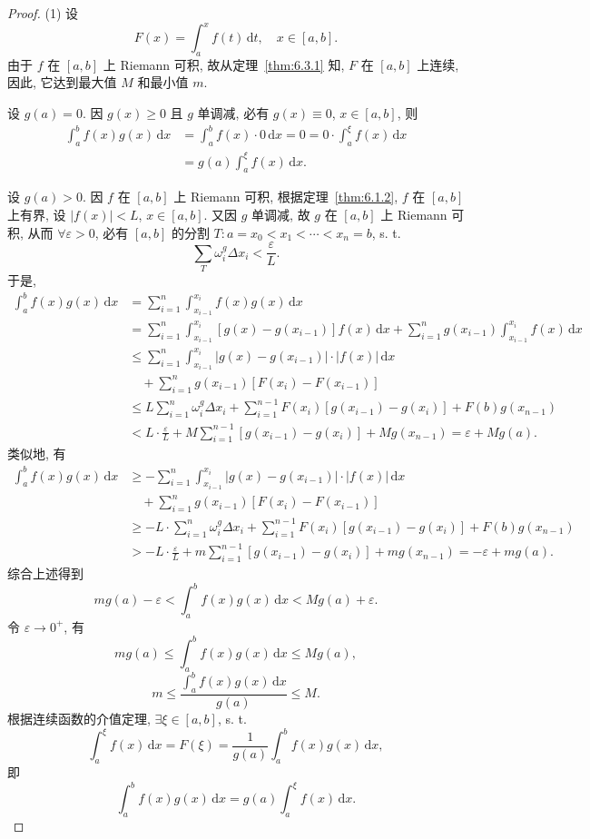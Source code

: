\begin{proof}
(1) 设
\[
F(x)=\int_{a}^{x}f(t)\,\mathrm{d}t,\quad x\in[a,b].
\]
由于 $f$ 在 $[a,b]$ 上 Riemann 可积, 故从定理~\ref{thm:6.3.1} 知, $F$ 在 $[a,b]$ 上连续, 因此, 它达到最大值 $M$ 和最小值 $m$.

设 $g(a)=0$. 因 $g(x)\geqslant 0$ 且 $g$ 单调减, 必有 $g(x)\equiv 0$, $x\in[a,b]$, 则
\begin{align*}
\int_{a}^{b}f(x)g(x)\,\mathrm{d}x&=\int_{a}^{b}f(x)\cdot 0\,\mathrm{d}x=0=0\cdot\int_{a}^{\xi}f(x)\,\mathrm{d}x\\
&=g(a)\int_{a}^{\xi}f(x)\,\mathrm{d}x.
\end{align*}

设 $g(a)>0$. 因 $f$ 在 $[a,b]$ 上 Riemann 可积, 根据定理~\ref{thm:6.1.2}, $f$ 在 $[a,b]$ 上有界, 设 $|f(x)|<L$, $x\in[a,b]$. 又因 $g$ 单调减, 故 $g$ 在 $[a,b]$ 上 Riemann 可积, 从而 $\forall\varepsilon>0$, 必有 $[a,b]$ 的分割 $T:a=x_{0}<x_{1}<\cdots<x_{n}=b$, s. t.
\[
\sum_{T}\omega_{i}^{g}\Delta x_{i}<\frac{\varepsilon}{L}.
\]
于是,
\begin{align*}
\int_{a}^{b}f(x)g(x)\,\mathrm{d}x&=\sum_{i=1}^{n}\int_{x_{i-1}}^{x_{i}}f(x)g(x)\,\mathrm{d}x\\
&=\sum_{i=1}^{n}\int_{x_{i-1}}^{x_{i}}[g(x)-g(x_{i-1})]f(x)\,\mathrm{d}x+\sum_{i=1}^{n}g(x_{i-1})\int_{x_{i-1}}^{x_{i}}f(x)\,\mathrm{d}x\\
&\leqslant\sum_{i=1}^{n}\int_{x_{i-1}}^{x_{i}}|g(x)-g(x_{i-1})|\cdot|f(x)|\,\mathrm{d}x\\
&\quad+\sum_{i=1}^{n}g(x_{i-1})[F(x_{i})-F(x_{i-1})]\\
&\leqslant L\sum_{i=1}^{n}\omega_{i}^{g}\Delta x_{i}+\sum_{i=1}^{n-1}F(x_{i})[g(x_{i-1})-g(x_{i})]+F(b)g(x_{n-1})\\
&<L\cdot\frac{\varepsilon}{L}+M\sum_{i=1}^{n-1}[g(x_{i-1})-g(x_{i})]+Mg(x_{n-1})=\varepsilon+Mg(a).
\end{align*}
类似地, 有
\begin{align*}
\int_{a}^{b}f(x)g(x)\,\mathrm{d}x&\geqslant-\sum_{i=1}^{n}\int_{x_{i-1}}^{x_{i}}|g(x)-g(x_{i-1})|\cdot|f(x)|\,\mathrm{d}x\\
&\quad+\sum_{i=1}^{n}g(x_{i-1})[F(x_{i})-F(x_{i-1})]\\
&\geqslant-L\cdot\sum_{i=1}^{n}\omega_{i}^{g}\Delta x_{i}+\sum_{i=1}^{n-1}F(x_{i})[g(x_{i-1})-g(x_{i})]+F(b)g(x_{n-1})\\
&>-L\cdot\frac{\varepsilon}{L}+m\sum_{i=1}^{n-1}[g(x_{i-1})-g(x_{i})]+mg(x_{n-1})=-\varepsilon+mg(a).
\end{align*}
综合上述得到
\[
mg(a)-\varepsilon<\int_{a}^{b}f(x)g(x)\,\mathrm{d}x<Mg(a)+\varepsilon.
\]
令 $\varepsilon\to 0^{+}$, 有
\[
mg(a)\leqslant\int_{a}^{b}f(x)g(x)\,\mathrm{d}x\leqslant Mg(a),
\]
\[
m\leqslant\frac{\displaystyle\int_{a}^{b}f(x)g(x)\,\mathrm{d}x}{g(a)}\leqslant M.
\]
根据连续函数的介值定理, $\exists\xi\in[a,b]$, s. t.
\[
\int_{a}^{\xi}f(x)\,\mathrm{d}x=F(\xi)=\frac{1}{g(a)}\int_{a}^{b}f(x)g(x)\,\mathrm{d}x,
\]
即
\[
\int_{a}^{b}f(x)g(x)\,\mathrm{d}x=g(a)\int_{a}^{\xi}f(x)\,\mathrm{d}x.
\]


\end{proof}
